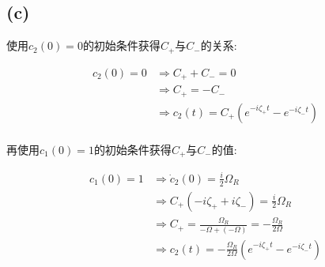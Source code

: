 \documentclass[twoside]{article}
\begin{document}
\subsection*{(c)}


使用$c_2(0) = 0$的初始条件获得$C_+$与$C_-$的关系:

\begin{equation}
    \begin{split}
        c_2(0) = 0 & \Rightarrow C_+ + C_- = 0                                                 \\
                   & \Rightarrow C_+ = - C_-                                                   \\
                   & \Rightarrow c_2(t) = C_+ \left(e^{-i \zeta_+ t} - e^{-i \zeta_- t}\right) \\
    \end{split}
\end{equation}

再使用$c_1(0) = 1$的初始条件获得$C_+$与$C_-$的值:

\begin{equation}
    \begin{split}
        c_1(0) = 1 & \Rightarrow \dot{c}_2 (0) = \frac{i}{2} \Omega_R                                               \\
                   & \Rightarrow C_+ \left(-i\zeta_+ + i \zeta_-\right) = \frac{i}{2} \Omega_R                      \\
                   & \Rightarrow C_+ = \frac{\Omega_R}{-\Omega + (-\Omega)} = -\frac{\Omega_R}{2\Omega}             \\
                   & \Rightarrow c_2 (t) = -\frac{\Omega_R}{2\Omega} \left(e^{-i\zeta_+ t} - e^{-i\zeta_- t}\right) \\
    \end{split}
\end{equation}
\end{document}
